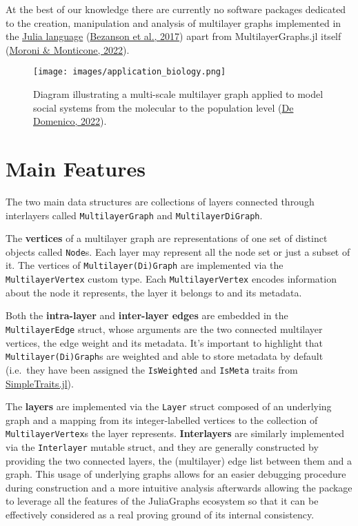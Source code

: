 \documentclass[
]{article}
\begin{document}
At the best of our knowledge there are currently no software packages
dedicated to the creation, manipulation and analysis of multilayer
graphs implemented in the \href{https://julialang.org}{Julia language}
(\protect\hyperlink{ref-Bezanson2017}{Bezanson et al., 2017}) apart from
MultilayerGraphs.jl itself
(\protect\hyperlink{ref-Moroni_Monticone_MultilayerGraphs_2022}{Moroni
\& Monticone, 2022}).

\begin{figure}
\centering
\texttt{[image: images/application\_biology.png]}
\caption{Diagram illustrating a multi-scale multilayer graph applied to
model social systems from the molecular to the population level
(\protect\hyperlink{ref-DeDomenicoIllustrated2022}{De Domenico, 2022}).
\label{fig:application-biology}}
\end{figure}

\hypertarget{main-features}{%
\section{Main Features}\label{main-features}}

The two main data structures are collections of layers connected through
interlayers called \texttt{MultilayerGraph} and
\texttt{MultilayerDiGraph}.

The \textbf{vertices} of a multilayer graph are representations of one
set of distinct objects called \texttt{Node}s. Each layer may represent
all the node set or just a subset of it. The vertices of
\texttt{Multilayer(Di)Graph} are implemented via the
\texttt{MultilayerVertex} custom type. Each \texttt{MultilayerVertex}
encodes information about the node it represents, the layer it belongs
to and its metadata.

Both the \textbf{intra-layer} and \textbf{inter-layer edges} are
embedded in the \texttt{MultilayerEdge} struct, whose arguments are the
two connected multilayer vertices, the edge weight and its metadata.
It's important to highlight that \texttt{Multilayer(Di)Graph}s are
weighted and able to store metadata by default (i.e.~they have been
assigned the \texttt{IsWeighted} and \texttt{IsMeta} traits from
\href{https://github.com/mauro3/SimpleTraits.jl}{SimpleTraits.jl}).

The \textbf{layers} are implemented via the \texttt{Layer} struct
composed of an underlying graph and a mapping from its integer-labelled
vertices to the collection of \texttt{MultilayerVertex}s the layer
represents. \textbf{Interlayers} are similarly implemented via the
\texttt{Interlayer} mutable struct, and they are generally constructed
by providing the two connected layers, the (multilayer) edge list
between them and a graph. This usage of underlying graphs allows for an
easier debugging procedure during construction and a more intuitive
analysis afterwards allowing the package to leverage all the features of
the JuliaGraphs ecosystem so that it can be effectively considered as a
real proving ground of its internal consistency.
\end{document}
